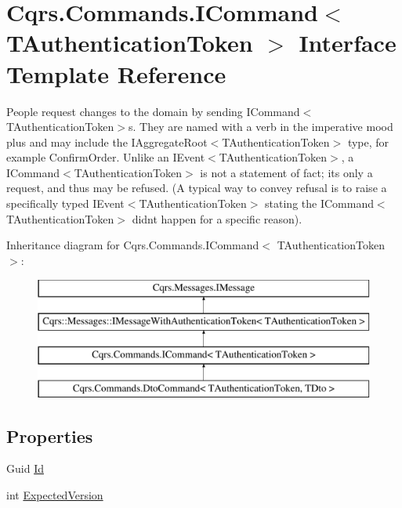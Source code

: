 \hypertarget{interfaceCqrs_1_1Commands_1_1ICommand}{}\section{Cqrs.\+Commands.\+I\+Command$<$ T\+Authentication\+Token $>$ Interface Template Reference}
\label{interfaceCqrs_1_1Commands_1_1ICommand}


People request changes to the domain by sending I\+Command$<$\+T\+Authentication\+Token$>$s. They are named with a verb in the imperative mood plus and may include the I\+Aggregate\+Root$<$\+T\+Authentication\+Token$>$ type, for example Confirm\+Order. Unlike an I\+Event$<$\+T\+Authentication\+Token$>$, a I\+Command$<$\+T\+Authentication\+Token$>$ is not a statement of fact; it\textquotesingle{}s only a request, and thus may be refused. (A typical way to convey refusal is to raise a specifically typed I\+Event$<$\+T\+Authentication\+Token$>$ stating the I\+Command$<$\+T\+Authentication\+Token$>$ didn\textquotesingle{}t happen for a specific reason).  


Inheritance diagram for Cqrs.\+Commands.\+I\+Command$<$ T\+Authentication\+Token $>$\+:\begin{figure}[H]
\begin{center}
\leavevmode
\includegraphics[height=4.000000cm]{interfaceCqrs_1_1Commands_1_1ICommand}
\end{center}
\end{figure}
\subsection*{Properties}
\begin{DoxyCompactItemize}
\item 
Guid \hyperlink{interfaceCqrs_1_1Commands_1_1ICommand_a79acca2013a08295cef32f1917d97e96}{Id}
\item 
int \hyperlink{interfaceCqrs_1_1Commands_1_1ICommand_a8b207da81f36bd4426e83e2ec948eb49}{Expected\+Version}
\end{DoxyCompactItemize}


